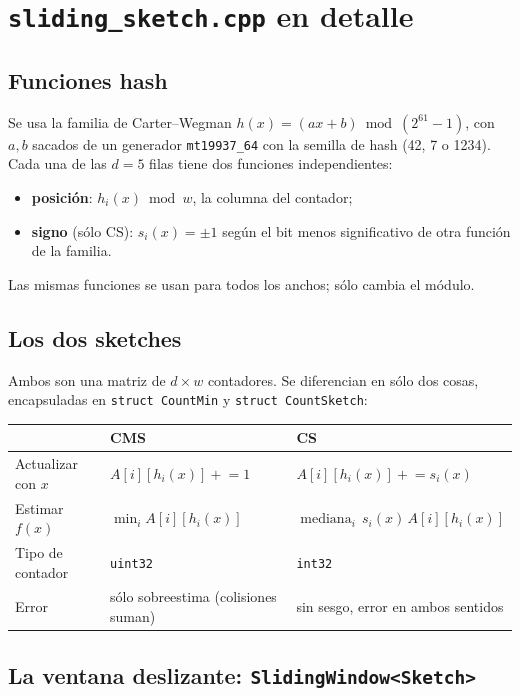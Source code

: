 \documentclass[11pt]{article}
\newcommand{\code}[1]{\texttt{#1}}
\begin{document}
\section{\code{sliding\_sketch.cpp} en detalle}\label{sec:sliding}

\subsection{Funciones hash}
Se usa la familia de Carter–Wegman $h(x)=(a x+b)\bmod(2^{61}-1)$, con $a,b$ sacados de un generador \code{mt19937\_64} con la semilla de hash (42, 7 o 1234). Cada una de las $d=5$ filas tiene dos funciones independientes:
\begin{itemize}
    \item \textbf{posición}: $h_i(x)\bmod w$, la columna del contador;
    \item \textbf{signo} (sólo CS): $s_i(x)=\pm1$ según el bit menos significativo de otra función de la familia.
\end{itemize}
Las mismas funciones se usan para todos los anchos; sólo cambia el módulo.

\subsection{Los dos sketches}
Ambos son una matriz de $d\times w$ contadores. Se diferencian en sólo dos cosas, encapsuladas en \code{struct CountMin} y \code{struct CountSketch}:

\begin{center}
\begin{tabular}{p{3.2cm}p{5.4cm}p{5.4cm}}
\toprule
 & \textbf{CMS} & \textbf{CS} \\
\midrule
Actualizar con $x$ & $A[i][h_i(x)] \mathrel{+}= 1$ & $A[i][h_i(x)] \mathrel{+}= s_i(x)$ \\
Estimar $f(x)$ & $\min_i A[i][h_i(x)]$ & $\operatorname{mediana}_i\, s_i(x)\,A[i][h_i(x)]$ \\
Tipo de contador & \code{uint32} & \code{int32} \\
Error & sólo sobreestima (colisiones suman) & sin sesgo, error en ambos sentidos \\
\bottomrule
\end{tabular}
\end{center}

\subsection{La ventana deslizante: \code{SlidingWindow<Sketch>}}
\end{document}
